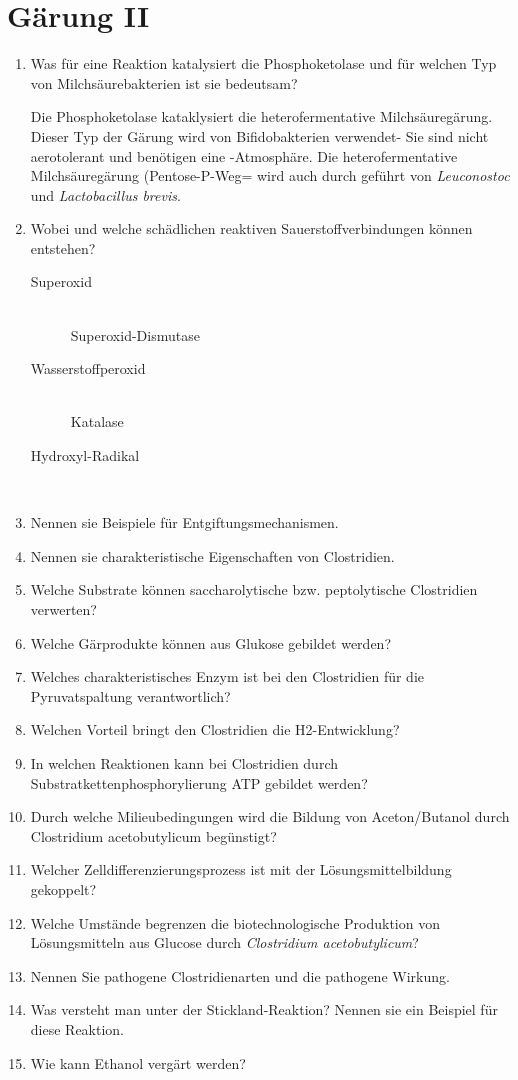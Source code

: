 
\section{Gärung II}
\begin{enumerate}
	\item Was für eine Reaktion katalysiert die Phosphoketolase und für welchen Typ von Milchsäurebakterien ist sie bedeutsam?

		Die Phosphoketolase kataklysiert die heterofermentative Milchsäuregärung.
		Dieser Typ der Gärung wird von Bifidobakterien verwendet-
		Sie sind nicht aerotolerant und benötigen eine -Atmosphäre.
		Die heterofermentative Milchsäuregärung (Pentose-P-Weg= wird auch durch geführt von \emph{Leuconostoc} und
		\emph{Lactobacillus brevis}.
		
	\item Wobei und welche schädlichen reaktiven Sauerstoffverbindungen können entstehen?

		\begin{description}
			\item[Superoxid ] \hfill\\
				Superoxid-Dismutase
			\item[Wasserstoffperoxid ] \hfill\\
				Katalase
			\item[Hydroxyl-Radikal ] \hfill\\
		\end{description}

	\item Nennen sie Beispiele für Entgiftungsmechanismen.
	\item Nennen sie charakteristische Eigenschaften von Clostridien.
	\item Welche Substrate können saccharolytische bzw. peptolytische Clostridien verwerten?
	\item Welche Gärprodukte können aus Glukose gebildet werden?
	\item Welches charakteristisches Enzym ist bei den Clostridien für die Pyruvatspaltung verantwortlich?
	\item Welchen Vorteil bringt den Clostridien die H2-Entwicklung?
	\item In welchen Reaktionen kann bei Clostridien durch Substratkettenphosphorylierung ATP gebildet werden?
	\item Durch welche Milieubedingungen wird die Bildung von Aceton/Butanol durch Clostridium acetobutylicum begünstigt?
	\item Welcher Zelldifferenzierungsprozess ist mit der Lösungsmittelbildung gekoppelt?
	\item Welche Umstände begrenzen die biotechnologische Produktion von Lösungsmitteln aus Glucose durch \emph{Clostridium acetobutylicum}?
	\item Nennen Sie pathogene Clostridienarten und die pathogene Wirkung.
	\item Was versteht man unter der Stickland-Reaktion? Nennen sie ein Beispiel für diese Reaktion.
	\item Wie kann Ethanol vergärt werden?
\end{enumerate}

